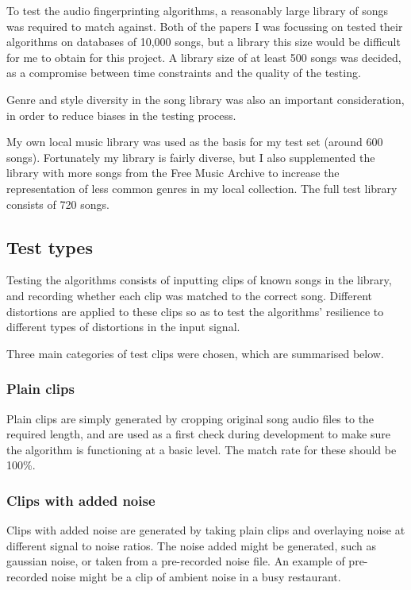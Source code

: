 \documentclass[12pt,a4paper,twoside,openright]{report}
\begin{document}
To test the audio fingerprinting algorithms, a reasonably large library of songs was required to match against. Both of the papers I was focussing on tested their algorithms on databases of 10,000 songs, but a library this size would be difficult for me to obtain for this project. A library size of at least 500 songs was decided, as a compromise between time constraints and the quality of the testing.

Genre and style diversity in the song library was also an important consideration, in order to reduce biases in the testing process.

My own local music library was used as the basis for my test set (around 600 songs). Fortunately my library is fairly diverse, but I also supplemented the library with more songs from the Free Music Archive to increase the representation of less common genres in my local collection. The full test library consists of 720 songs.

\subsection{Test types}

Testing the algorithms consists of inputting clips of known songs in the library, and recording whether each clip was matched to the correct song. Different distortions are applied to these clips so as to test the algorithms' resilience to different types of distortions in the input signal.

Three main categories of test clips were chosen, which are summarised below.

\subsubsection{Plain clips}

Plain clips are simply generated by cropping original song audio files to the required length, and are used as a first check during development to make sure the algorithm is functioning at a basic level. The match rate for these should be 100\%.

\subsubsection{Clips with added noise}

Clips with added noise are generated by taking plain clips and overlaying noise at different signal to noise ratios. The noise added might be generated, such as gaussian noise, or taken from a pre-recorded noise file. An example of pre-recorded noise might be a clip of ambient noise in a busy restaurant.
\end{document}
